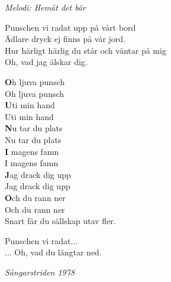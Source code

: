 {\footnotesize\textit{Melodi: Hemåt det bär}}\par
\vspace{10pt}
Punschen vi radat upp på vårt bord\\
Ädlare dryck ej finns på vår jord.\\
Hur härligt härlig du står och väntar på mig\\
Oh, vad jag älskar dig.\par
\vspace{10pt}
{\textbf Oh ljuva punsch}\\
Oh ljuva punsch\\
{\textbf Uti min hand}\\
Uti min hand\\
{\textbf Nu tar du plats}\\
Nu tar du plats\\
{\textbf I magens famn}\\
I magens famn\\
{\textbf Jag drack dig upp}\\
Jag drack dig upp\\
{\textbf Och du rann ner}\\
Och du rann ner\\
Snart får du sällskap utav fler.\par
\vspace{10pt}
Punschen vi radat...\\
... Oh, vad du längtar ned.\par
\vspace{10pt}
{\footnotesize\textit{Sångarstriden 1978}}
